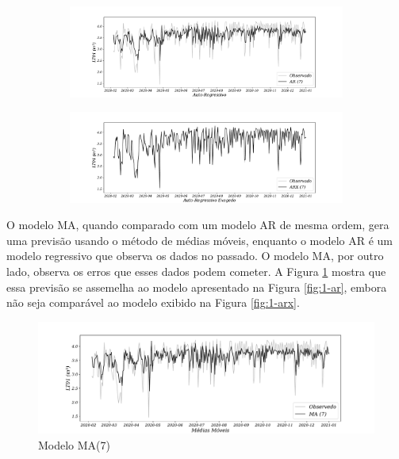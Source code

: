 \begin{figure}[H]
	\centering
	\caption{Comparação dos modelos AR e ARX \label{fig:1-ar} \label{fig:1-arx}}
	\begin{subfigure}{1\textwidth}
		\includegraphics[width=\linewidth]{Modelos/Figuras/AR}
		
		
	\end{subfigure}
	
	\begin{subfigure}{1\textwidth}
		\includegraphics[width=\linewidth]{Modelos/Figuras/ARX}
		
		
	\end{subfigure}
	
	
\end{figure}

O modelo MA, quando comparado com um modelo AR de mesma ordem, gera uma previsão usando o método de médias móveis, enquanto o modelo AR é um modelo regressivo que observa os dados no passado. O modelo MA, por outro lado, observa os erros que esses dados podem cometer. A Figura \ref{fig:1-ma} mostra que essa previsão se assemelha ao modelo apresentado na Figura \ref{fig:1-ar}, embora não seja comparável ao modelo exibido na Figura \ref{fig:1-arx}.

\begin{figure}[H]
	\centering
	\caption{Modelo MA(7) }
	\label{fig:1-ma}
	\includegraphics[width=1\linewidth]{Modelos/Figuras/MA}
	
	
\end{figure}

